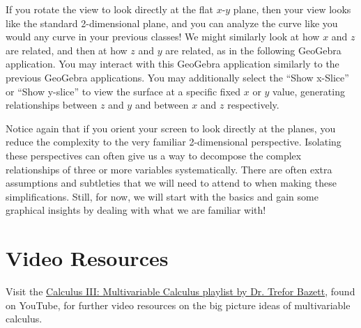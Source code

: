 \documentclass{ximera}
\begin{document}
\begin{center}
\end{center}

If you rotate the view to look directly at the flat $x$-$y$ plane, then your view looks like the standard 2-dimensional plane, and you can analyze the curve like you would any curve in your previous classes! We might similarly look at how $x$ and $z$ are related, and then at how $z$ and $y$ are related, as in the following GeoGebra application. You may interact with this GeoGebra application similarly to the previous GeoGebra applications. You may additionally select the ``Show x-Slice'' or ``Show y-slice'' to view the surface at a specific fixed $x$ or $y$ value, generating relationships between $z$ and $y$ and between $x$ and $z$ respectively.

\begin{center}
\end{center}

Notice again that if you orient your screen to look directly at the planes, you reduce the complexity to the very familiar 2-dimensional perspective. Isolating these perspectives can often give us a way to decompose the complex relationships of three or more variables systematically. There are often extra assumptions and subtleties that we will need to attend to when making these simplifications. Still, for now, we will start with the basics and gain some graphical insights by dealing with what we are familiar with!

\section{Video Resources}

Visit the \href{https://www.youtube.com/playlist?list=PLHXZ9OQGMqxc_CvEy7xBKRQr6I214QJcd}{Calculus III: Multivariable Calculus playlist by Dr. Trefor Bazett}, found on YouTube, for further video resources on the big picture ideas of multivariable calculus.
\end{document}
